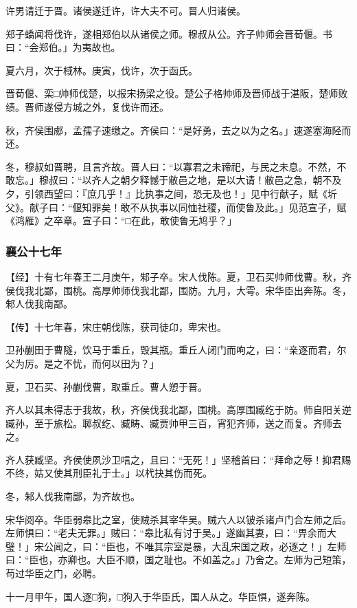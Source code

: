 \documentclass[]{article}
\begin{document}
许男请迁于晋。诸侯遂迁许，许大夫不可。晋人归诸侯。

郑子蟜闻将伐许，遂相郑伯以从诸侯之师。穆叔从公。齐子帅师会晋荀偃。书曰：``会郑伯。」为夷故也。

夏六月，次于棫林。庚寅，伐许，次于函氏。

晋荀偃、栾□帅师伐楚，以报宋扬梁之役。楚公子格帅师及晋师战于湛阪，楚师败绩。晋师遂侵方城之外，复伐许而还。

秋，齐侯围郕，孟孺子速缴之。齐侯曰：``是好勇，去之以为之名。」速遂塞海陉而还。

冬，穆叔如晋聘，且言齐故。晋人曰：``以寡君之未禘祀，与民之未息。不然，不敢忘。」穆叔曰：``以齐人之朝夕释憾于敝邑之地，是以大请！敝邑之急，朝不及夕，引领西望曰：『庶几乎！』比执事之间，恐无及也！」见中行献子，赋《圻父》。献子曰：``偃知罪矣！敢不从执事以同恤社稷，而使鲁及此。」见范宣子，赋《鸿雁》之卒章。宣子曰：``□在此，敢使鲁无鸠乎？」

\hypertarget{header-n2041}{%
\subsubsection{襄公十七年}\label{header-n2041}}

【经】十有七年春王二月庚午，邾子卒。宋人伐陈。夏，卫石买帅师伐曹。秋，齐侯伐我北鄙，围桃。高厚帅师伐我北鄙，围防。九月，大雩。宋华臣出奔陈。冬，邾人伐我南鄙。

【传】十七年春，宋庄朝伐陈，获司徒卬，卑宋也。

卫孙蒯田于曹隧，饮马于重丘，毁其瓶。重丘人闭门而呴之，曰：``亲逐而君，尔父为厉。是之不忧，而何以田为？」

夏，卫石买、孙蒯伐曹，取重丘。曹人愬于晋。

齐人以其未得志于我故，秋，齐侯伐我北鄙，围桃。高厚围臧纥于防。师自阳关逆臧孙，至于旅松。郰叔纥、臧畴、臧贾帅甲三百，宵犯齐师，送之而复。齐师去之。

齐人获臧坚。齐侯使夙沙卫唁之，且曰：``无死！」坚稽首曰：``拜命之辱！抑君赐不终，姑又使其刑臣礼于士。」以杙抉其伤而死。

冬，邾人伐我南鄙，为齐故也。

宋华阅卒。华臣弱皋比之室，使贼杀其宰华吴。贼六人以铍杀诸卢门合左师之后。左师惧曰：``老夫无罪。」贼曰：``皋比私有讨于吴。」遂幽其妻，曰：``畀余而大璧！」宋公闻之，曰：``臣也，不唯其宗室是暴，大乱宋国之政，必逐之！」左师曰：``臣也，亦卿也。大臣不顺，国之耻也。不如盖之。」乃舍之。左师为己短策，苟过华臣之门，必聘。

十一月甲午，国人逐□狗，□狗入于华臣氏，国人从之。华臣惧，遂奔陈。
\end{document}
